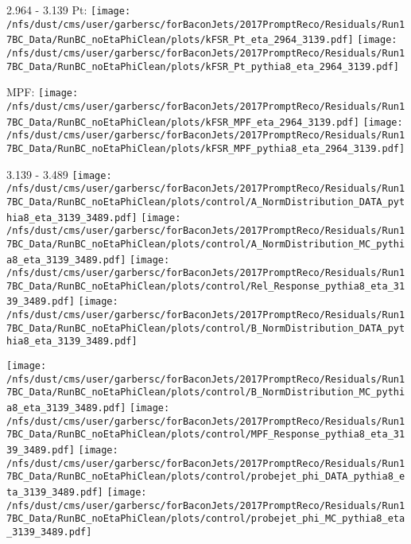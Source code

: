 \documentclass[t,compress]{beamer}
\begin{document}
\begin{frame}{2.964 - 3.139}
	 Pt: \texttt{[image: /nfs/dust/cms/user/garbersc/forBaconJets/2017PromptReco/Residuals/Run17BC\_Data/RunBC\_noEtaPhiClean/plots/kFSR\_Pt\_eta\_2964\_3139.pdf]}
	\texttt{[image: /nfs/dust/cms/user/garbersc/forBaconJets/2017PromptReco/Residuals/Run17BC\_Data/RunBC\_noEtaPhiClean/plots/kFSR\_Pt\_pythia8\_eta\_2964\_3139.pdf]}
\newline

	 MPF: \texttt{[image: /nfs/dust/cms/user/garbersc/forBaconJets/2017PromptReco/Residuals/Run17BC\_Data/RunBC\_noEtaPhiClean/plots/kFSR\_MPF\_eta\_2964\_3139.pdf]}
	\texttt{[image: /nfs/dust/cms/user/garbersc/forBaconJets/2017PromptReco/Residuals/Run17BC\_Data/RunBC\_noEtaPhiClean/plots/kFSR\_MPF\_pythia8\_eta\_2964\_3139.pdf]}
\end{frame}

\begin{frame}{3.139 - 3.489}
	\texttt{[image: /nfs/dust/cms/user/garbersc/forBaconJets/2017PromptReco/Residuals/Run17BC\_Data/RunBC\_noEtaPhiClean/plots/control/A\_NormDistribution\_DATA\_pythia8\_eta\_3139\_3489.pdf]}
	\texttt{[image: /nfs/dust/cms/user/garbersc/forBaconJets/2017PromptReco/Residuals/Run17BC\_Data/RunBC\_noEtaPhiClean/plots/control/A\_NormDistribution\_MC\_pythia8\_eta\_3139\_3489.pdf]}
	\texttt{[image: /nfs/dust/cms/user/garbersc/forBaconJets/2017PromptReco/Residuals/Run17BC\_Data/RunBC\_noEtaPhiClean/plots/control/Rel\_Response\_pythia8\_eta\_3139\_3489.pdf]}
	\texttt{[image: /nfs/dust/cms/user/garbersc/forBaconJets/2017PromptReco/Residuals/Run17BC\_Data/RunBC\_noEtaPhiClean/plots/control/B\_NormDistribution\_DATA\_pythia8\_eta\_3139\_3489.pdf]}
\newline

	\texttt{[image: /nfs/dust/cms/user/garbersc/forBaconJets/2017PromptReco/Residuals/Run17BC\_Data/RunBC\_noEtaPhiClean/plots/control/B\_NormDistribution\_MC\_pythia8\_eta\_3139\_3489.pdf]}
	\texttt{[image: /nfs/dust/cms/user/garbersc/forBaconJets/2017PromptReco/Residuals/Run17BC\_Data/RunBC\_noEtaPhiClean/plots/control/MPF\_Response\_pythia8\_eta\_3139\_3489.pdf]}
	\texttt{[image: /nfs/dust/cms/user/garbersc/forBaconJets/2017PromptReco/Residuals/Run17BC\_Data/RunBC\_noEtaPhiClean/plots/control/probejet\_phi\_DATA\_pythia8\_eta\_3139\_3489.pdf]}
	\texttt{[image: /nfs/dust/cms/user/garbersc/forBaconJets/2017PromptReco/Residuals/Run17BC\_Data/RunBC\_noEtaPhiClean/plots/control/probejet\_phi\_MC\_pythia8\_eta\_3139\_3489.pdf]}
\end{frame}
\end{document}
